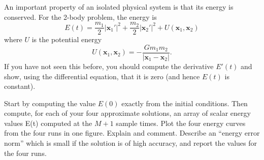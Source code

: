 \documentclass[minion]{homework}
\newcommand{\bfx}{\mathbf{x}}
\begin{document}
\begin{problems}
\begin{subproblems}
\item An important property of an isolated physical system is that
its energy is conserved.  For the 2-body problem, the energy
is 
\[
E(t) = \frac{m_1}{2}|\bfx_1'|^2 + \frac{m_2}{2}|\bfx_2'|^2 + U(\bfx_1,\bfx_2)
\]
where $U$ is the potential energy
\[
U(\bfx_1,\bfx_2) = -\frac{Gm_1m_2}{|\bfx_1-\bfx_2|}.
\]
If you have not seen this before, you should compute 
the derivative $E'(t)$ and show, using the differential equation, 
that it is zero (and hence $E(t)$ is constant).

Start by computing the value $E(0)$ exactly from the initial conditions. Then compute, for each of your four approximate
solutions, an array of scalar energy values E(t) computed at the 
$M+1$ sample times.  Plot the four energy curves from the four runs in one figure. Explain and comment. Describe an ``energy error norm'' which is small if the solution is of high accuracy, and report the values for the four runs.

\end{subproblems}

\end{problems}
\end{document}
